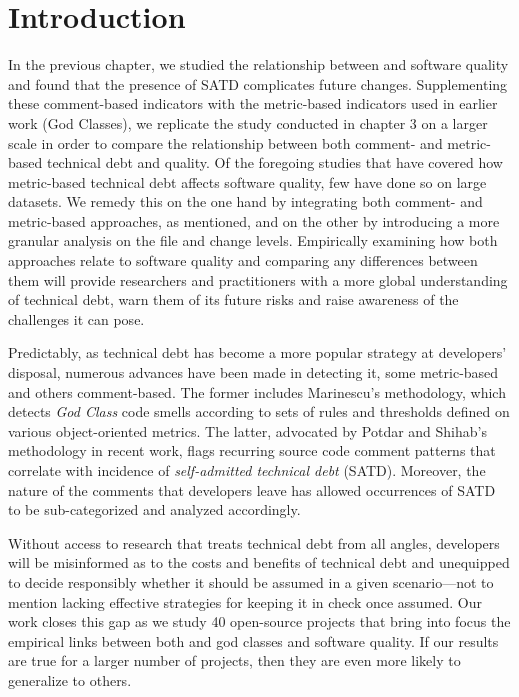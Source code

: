 \section{Introduction}
\label{chap4:sec:introduction}
\setlength\parindent{24pt} 

In the previous chapter, we studied the relationship between \SATD and software quality and found that the presence of SATD complicates future changes. Supplementing these comment-based indicators with the metric-based indicators used in earlier work \cite{zazworka2011investigating} (God Classes), we replicate the study conducted in chapter 3 on a larger scale in order to compare the relationship between both comment- and metric-based technical debt and quality. Of the foregoing studies that have covered how metric-based technical debt affects software quality, few have done so on large datasets. We remedy this on the one hand by integrating both comment- and metric-based approaches, as mentioned, and on the other by introducing a more granular analysis on the file and change levels. Empirically examining how both approaches relate to software quality and comparing any differences between them will provide researchers and practitioners with a more global understanding of technical debt, warn them of its future risks and raise awareness of the challenges it can pose.

Predictably, as technical debt has become a more popular strategy at developers' disposal, numerous advances have been made in detecting it, some metric-based and others comment-based. The former includes Marinescu's \cite{marinescu2004detection} methodology, which detects \textit{God Class} code smells according to sets of rules and thresholds defined on various object-oriented metrics. The latter, advocated by Potdar and Shihab's \cite{ICSM_PotdarS14} methodology in recent work, flags recurring source code comment patterns that correlate with incidence of \textit{self-admitted technical debt} (SATD). Moreover, the nature of the comments that developers leave has allowed occurrences of SATD to be sub-categorized and analyzed accordingly.

Without access to research that treats technical debt from all angles, developers will be misinformed as to the costs and benefits of technical debt and unequipped to decide responsibly whether it should be assumed in a given scenario---not to mention lacking effective strategies for keeping it in check once assumed. Our work closes this gap as we study 40 open-source projects that bring into focus the empirical links between both \SATD and god classes and software quality. If our results are true for a larger number of projects, then they are even more likely to generalize to others. 

